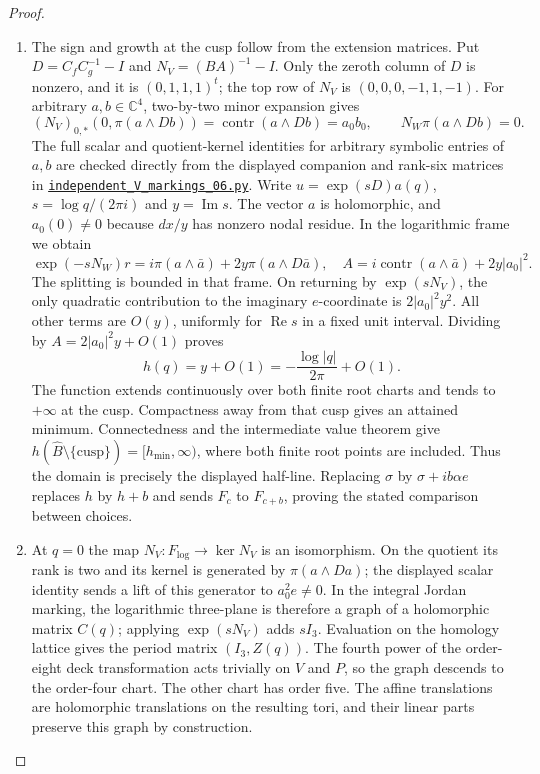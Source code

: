 \begin{proof}
\begin{enumerate}[label={$\langle1\rangle$\arabic*.}]
\item The sign and growth at the cusp follow from the extension
matrices.  Put $D=C_fC_g^{-1}-I$ and $N_V=(BA)^{-1}-I$.
Only the zeroth column of $D$ is nonzero, and it is $(0,1,1,1)^t$;
the top row of $N_V$ is $(0,0,0,-1,1,-1)$.
For arbitrary $a,b\in\mathbb C^4$, two-by-two minor expansion gives
\[
(N_V)_{0,*}(0,\pi(a\wedge Db))
 =\operatorname{contr}(a\wedge Db)=a_0b_0,
 \qquad N_W\pi(a\wedge Db)=0.
\]
The full scalar and quotient-kernel identities for arbitrary symbolic
entries of $a,b$ are checked directly from the displayed companion and
rank-six matrices in
\href{https://github.com/KokunoYumeto/s6-complex-structure-workbench/blob/83d76022bcd442278b760db9ff438afceed6c6ea/pro_returns/S6_SERIES_GRIND_checkpoint_10_20261120T0211Z/code/current_audits/audit_corrections/code/independent_V_markings_06.py}{\texttt{independent\_V\_markings\_06.py}}.
Write $u=\exp(sD)a(q)$, $s=\log q/(2\pi i)$ and $y=\operatorname{Im}s$.
The vector $a$ is holomorphic, and $a_0(0)\ne0$ because $dx/y$ has
nonzero nodal residue.  In the logarithmic frame we obtain
\[
\exp(-sN_W)r=i\pi(a\wedge\bar a)+2y\pi(a\wedge D\bar a),
\quad
A=i\operatorname{contr}(a\wedge\bar a)+2y|a_0|^2.
\]
The splitting is bounded in that frame.  On returning by
$\exp(sN_V)$, the only quadratic contribution to the imaginary
$e$-coordinate is $2|a_0|^2y^2$.  All other terms are $O(y)$,
uniformly for $\operatorname{Re}s$ in a fixed unit interval.
Dividing by $A=2|a_0|^2y+O(1)$ proves
\[
h(q)=y+O(1)=-\frac{\log|q|}{2\pi}+O(1).
\]
The function extends continuously over both finite root charts and
tends to $+\infty$ at the cusp.  Compactness away from that cusp gives
an attained minimum.  Connectedness and the intermediate value theorem give
$h(\widehat B\setminus\{\text{cusp}\})=[h_{\min},\infty)$,
where both finite root points are included.  Thus the domain is precisely the
displayed half-line.  Replacing $\sigma$ by $\sigma+ib\alpha e$ replaces
$h$ by $h+b$ and sends $F_c$ to $F_{c+b}$, proving the stated
comparison between choices.

\item At $q=0$ the map $N_V:F_{\log}\to\ker N_V$ is an isomorphism.
On the quotient its rank is two and its kernel is generated by
$\pi(a\wedge Da)$; the displayed scalar identity sends a lift of this
generator to $a_0^2e\ne0$.  In the integral Jordan marking, the
logarithmic three-plane is therefore a graph of a holomorphic matrix
$C(q)$; applying $\exp(sN_V)$ adds $sI_3$.  Evaluation on the homology
lattice gives the period matrix $(I_3,Z(q))$.
The fourth power of the order-eight deck transformation acts trivially
on $V$ and $P$, so the graph descends to the order-four chart.
The other chart has order five.  The affine translations are
holomorphic translations on the resulting tori, and their linear
parts preserve this graph by construction.

\end{enumerate}
\end{proof}

